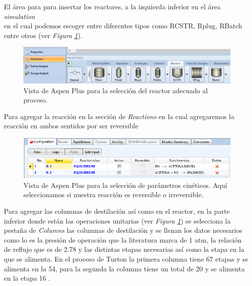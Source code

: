     El área para  para insertar los reactores, a la izquierda inferior en el área \textit{simulation}\\ en el cual podemos escoger  entre diferentes tipos como RCSTR, Rplug, RBatch entre otros (ver\textit{ Figura \ref{fig:reactor}}).
        \begin{figure}[H]
            \centering
            \includegraphics[scale=0.5]{images/Paso_3.PNG}
            \caption{Vista de Aspen Plus para la selección del reactor adecuado al proceso.}
            \label{fig:reactor}
        \end{figure}
    Para agregar la reacción en la sección de
    \textit{Reactions} en la cual agregaremos la reacción en ambos sentidos por ser reversible
        \begin{figure}[H]
            \centering
            \includegraphics[scale=0.5]{images/Paso_4.PNG}
            \caption{Vista de Aspen Plus para la selección de parámetros cinéticos. Aquí seleccionamos si nuestra reacción es reversible o irreversible.}
            \label{fig:Parametrocineticos}
        \end{figure}
    Para agregar las columnas de destilación así como en el reactor, en la parte inferior  donde están las operaciones unitarias (ver\textit{ Figura \ref{fig:reactor}}) se selecciona  la pestaña de \textit{Columns} las columnas de destilación  y se llenan los datos necesarios como lo es la presión de operación que la literatura marca de 1 atm, la relación de reflujo que es de 2.78  y las distintas etapas necesarias así como la etapa  en la que se alimenta. En el proceso de Turton la primera columna tiene 67 etapas y se alimenta en la 54, para la segunda la columna tiene un total de 20 y se alimenta en la etapa 16 \cite{article}.
